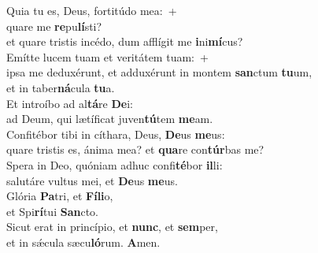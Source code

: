 \evenverse Quia tu es, Deus, fortitúdo mea:~+\\\evenverse  quare me \textbf{re}pu\textbf{lí}sti?~\*\\
\evenverse et quare tristis incédo, dum afflígit me \textbf{i}ni\textbf{mí}cus?\\
\oddverse Emítte lucem tuam et veritátem tuam:~+\\
\oddverse  ipsa me deduxérunt, et adduxérunt in montem \textbf{san}ctum \textbf{tu}um,~\*\\
\oddverse et in taber\textbf{ná}cula \textbf{tu}a.\\
\evenverse Et introíbo ad al\textbf{tá}re \textbf{De}i:~\*\\
\evenverse ad Deum, qui lætíficat juven\textbf{tú}tem \textbf{me}am.\\
\oddverse Confitébor tibi in cíthara, Deus, \textbf{De}us \textbf{me}us:~\*\\
\oddverse quare tristis es, ánima mea? et \textbf{qua}re con\textbf{túr}bas me?\\
\evenverse Spera in Deo, quóniam adhuc confi\textbf{té}bor \textbf{il}li:~\*\\
\evenverse salutáre vultus mei, et \textbf{De}us \textbf{me}us.\\
\oddverse Glória \textbf{Pa}tri, et \textbf{Fí}\textbf{li}o,~\*\\
\oddverse et Spi\textbf{rí}tui \textbf{San}cto.\\
\evenverse Sicut erat in princípio, et \textbf{nunc}, et \textbf{sem}per,~\*\\
\evenverse et in sǽcula sæcu\textbf{ló}rum. \textbf{A}men.\\
